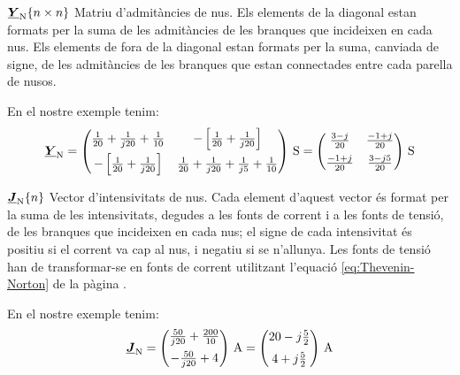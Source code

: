 \begin{list}{}
   {\setlength{\labelwidth}{20mm} \setlength{\leftmargin}{22mm} \setlength{\labelsep}{2mm}}

   \item[$\underline{\boldsymbol{Y}}_\mathrm{N}\{n \times n\}$] Matriu d'admitàncies de nus. Els elements de la diagonal estan formats per la suma de les admitàncies de les branques que incideixen en cada nus.
   Els elements de fora de la diagonal estan formats per la suma, canviada de signe, de les admitàncies de les branques que estan connectades entre cada parella de nusos.

   En el nostre exemple tenim:
   \[
      \mcmplx{Y}\ped{N} =
      \begin{pmatrix}
            \frac{1}{20} + \frac{1}{j 20} +  \frac{1}{10} &
            -\left[\frac{1}{20} + \frac{1}{j 20}\right] \\[2mm]
            -\left[\frac{1}{20} + \frac{1}{j 20}\right]  &
            \frac{1}{20} + \frac{1}{j 20} +  \frac{1}{j 5} + \frac{1}{10}
      \end{pmatrix}\unit{\,S} =
      \begin{pmatrix}
            \frac{3 - j}{20}  & \frac{-1 + j}{20} \\[2mm]
            \frac{-1 + j}{20} & \frac{3 - j 5}{20}
      \end{pmatrix}\unit{\,S}
   \]

   \item[$\underline{\boldsymbol{J}}_\mathrm{N}\{n\}$] Vector
d'intensivitats de nus. Cada element d'aquest vector és format per la suma de
les intensivitats, degudes a les fonts de corrent i a les fonts de tensió, de les
branques que incideixen en cada nus; el signe de cada intensivitat és positiu si el
corrent va cap al nus, i negatiu si se n'allunya. Les fonts de tensió han de
transformar-se en fonts de corrent utilitzant l'equació \eqref{eq:Thevenin-Norton} de
la pàgina \pageref{eq:Thevenin-Norton}.

   En el nostre exemple tenim:
   \[
      \mcmplx{J}\ped{N} =
      \begin{pmatrix}
            \frac{50}{j 20} +  \frac{200}{10} \\[2mm]
            - \frac{50}{j 20} + 4
      \end{pmatrix}\unit{\,A} =
      \begin{pmatrix}
            20 - j \frac{5}{2} \\[2mm]
            4 + j \frac{5}{2}
      \end{pmatrix}\unit{\,A}
   \]

\end{list}

